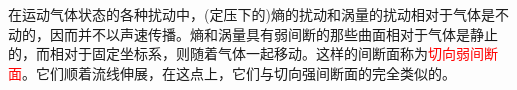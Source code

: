 \documentclass[12pt,a4paper]{article}
\begin{document}
在运动气体状态的各种扰动中，(定压下的)熵的扰动和涡量的扰动相对于气体是不动的，因而并不以声速传播。熵和涡量具有弱间断的那些曲面相对于气体是静止的，而相对于固定坐标系，则随着气体一起移动。这样的间断面称为\textcolor{red}{切向弱间断面}。它们顺着流线伸展，在这点上，它们与切向强间断面的完全类似的。









\end{document}
